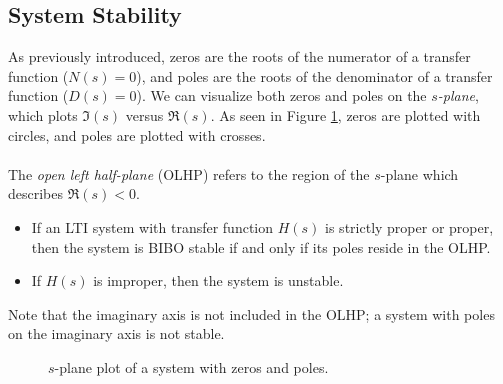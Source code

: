 \documentclass{report}
\begin{document}
\subsection{System Stability}
As previously introduced, zeros are the roots of the numerator of a transfer function ($N(s)=0$), and poles are the roots of the denominator of a transfer function ($D(s)=0$). 
We can visualize both zeros and poles on the \emph{$s$-plane}, which plots $\Im(s)$ versus $\Re(s)$. As seen in Figure \ref{s_plane}, zeros are plotted with circles, and poles are plotted with crosses.
\\ \\
The \emph{open left half-plane} (OLHP) refers to the region of the $s$-plane which describes $\Re(s)<0$. 
\begin{itemize}
    \item If an LTI system with transfer function $H(s)$ is strictly proper or proper, then the system is BIBO stable if and only if its poles reside in the OLHP.
    \item If $H(s)$ is improper, then the system is unstable.
\end{itemize}
Note that the imaginary axis is not included in the OLHP; a system with poles on the imaginary axis is not stable.

\begin{figure}[!hbt]
    \caption{$s$-plane plot of a system with zeros and poles.}
    \label{s_plane}
    \centering
\end{figure}
\end{document}
